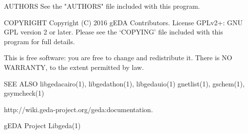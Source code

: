 AUTHORS
       See the "AUTHORS" file included with this program.

COPYRIGHT
       Copyright (C) 2016 gEDA Contributors. License GPLv2+: GNU GPL
       version 2 or later. Please see the `COPYING' file included with this
       program for full details.

       This is free software: you are free to change and redistribute it.
       There is NO WARRANTY, to the extent permitted by law.

SEE ALSO
       libgedacairo(1),  libgedathon(1), libgedauio(1) gnetlist(1), gschem(1),
       gsymcheck(1)

       http://wiki.geda-project.org/geda:documentation.



gEDA Project                                                        Libgeda(1)

